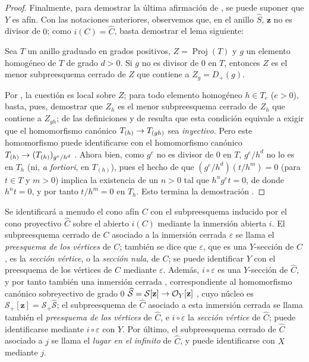 \documentclass[oneside,10pt]{amsart}
\makeatletter
\newcommand{\ega@arrow}[2]{\mathchoice{#1}{#2}{#2}{#2}}
\renewcommand{\to}{\ega@arrow{\longrightarrow}{\rightarrow}}
\let\EGAOriginalLabel\label
\renewcommand{\label}[1]{\phantomsection\EGAOriginalLabel{#1}}
\makeatother
\begin{document}
\begin{proof}
Finalmente, para demostrar la última afirmación de , se puede suponer que $Y$ es afín.
Con las notaciones anteriores, observemos que, en el anillo $\widehat{S}$, $\mathbf{z}$ no es divisor de $0$;
como $i(C)=\widehat{C}$, basta demostrar el lema siguiente:
\begin{lemma}[8.3.2.7]
\label{II.8.3.2.7-fr}
Sea $T$ un anillo graduado en grados positivos, $Z=\operatorname{Proj}(T)$ y $g$ un elemento homogéneo de $T$ de grado $d>0$.
Si $g$ no es divisor de $0$ en $T$, entonces $Z$ es el menor subpreesquema cerrado de $Z$ que contiene a $Z_g=D_+(g)$.
\end{lemma}

Por , la cuestión es local sobre $Z$;
para todo elemento homogéneo $h\in T_e$ ($e>0$), basta, pues, demostrar que $Z_h$ es el menor subpreesquema cerrado de $Z_h$ que contiene a $Z_{gh}$;
de las definiciones y de  resulta que esta condición equivale a exigir que el homomorfismo canónico $T_{(h)}\to T_{(gh)}$ sea \emph{inyectivo}.
Pero este homomorfismo puede identificarse con el homomorfismo canónico $T_{(h)}\to(T_{(h)})_{g^e/h^d}$ .
Ahora bien, como $g^e$ no es divisor de $0$ en $T$, $g^e/h^d$ no lo es en $T_h$ (ni, \emph{a fortiori}, en $T_{(h)}$), pues el hecho de que $(g^e/h^d)(t/h^m)=0$ (para $t\in T$ y $m>0$) implica la existencia de un $n>0$ tal que $h^ng^et=0$, de donde $h^nt=0$, y por tanto $t/h^m=0$ en $T_h$.
Esto termina la demostración .
\end{proof}
\begin{env}[8.3.3]
\label{II.8.3.3-fr}
Se identificará a menudo el cono afín $C$ con el subpreesquema inducido por el cono proyectivo $\widehat{C}$ sobre el abierto $i(C)$ mediante la inmersión abierta $i$.
El subpreesquema cerrado de $C$ asociado a la inmersión cerrada $\varepsilon$ se llama el \emph{preesquema de los vértices} de $C$;
también se dice que $\varepsilon$, que es una $Y$-sección de $C$, es la \emph{sección vértice}, o la \emph{sección nula}, de $C$;
se puede identificar $Y$ con el preesquema de los vértices de $C$ mediante $\varepsilon$.
Además, $i\circ\varepsilon$ es una $Y$-sección de $\widehat{C}$, y por tanto también una inmersión cerrada , correspondiente al homomorfismo canónico sobreyectivo de grado $0$ $\widehat{\mathcal{S}}=\mathcal{S}[\mathbf{z}]\to\mathcal{O}_Y[\mathbf{z}]$ , cuyo núcleo es $\mathcal{S}_+[\mathbf{z}]=\mathcal{S}_+\widehat{\mathcal{S}}$;
el subpreesquema de $\widehat{C}$ asociado a esta inmersión cerrada se llama también el \emph{preesquema de los vértices} de $\widehat{C}$, e $i\circ\varepsilon$ la \emph{sección vértice} de $\widehat{C}$;
puede identificarse mediante $i\circ\varepsilon$ con $Y$.
Por último, el subpreesquema cerrado de $\widehat{C}$ asociado a $j$ se llama el \emph{lugar en el infinito} de $\widehat{C}$, y puede identificarse con $X$ mediante $j$.
\end{env}
\end{document}
